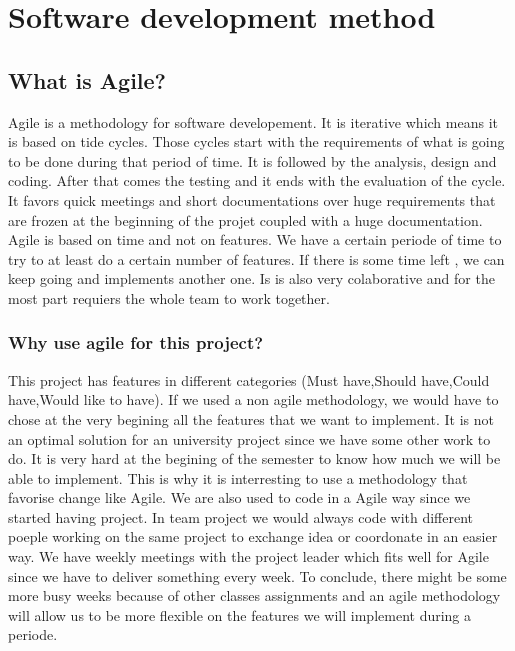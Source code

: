 \section{Software development method}
\subsection{What is Agile?}

Agile is a methodology for software developement. It is iterative which means it is based on tide cycles. Those cycles start with the requirements of what is going to be done during that period of time.
It is followed by the analysis, design and coding. After that comes the testing and it ends with the evaluation of the cycle.
It favors quick meetings and short documentations over huge requirements that are frozen at the beginning of the projet coupled with a huge documentation.
Agile is based on time and not on features. We have a certain periode of time to try to at least do a certain number of features. If there is some time left , we can keep going and implements another one.
Is is also very colaborative and for the most part requiers the whole team to work together.


\subsubsection{Why use agile for this project?}

This project has features in different categories (Must have,Should have,Could have,Would like to have). If we used a non agile methodology, we would have to chose at the very begining all the features that we want to implement.
It is not an optimal solution for an university project since we have some other work to do. It is very hard at the begining of the semester to know how much we will be able to implement. This is why it is interresting to use a methodology that favorise change like Agile.
We are also used to code in a Agile way since we started having project. In team project we would always code with different poeple working on the same project to exchange idea or coordonate in an easier way.
We have weekly meetings with the project leader which fits well for Agile since we have to deliver something every week.
To conclude, there might be some more busy weeks because of other classes assignments and an agile methodology will allow us to be more flexible on the features we will implement during a periode.


